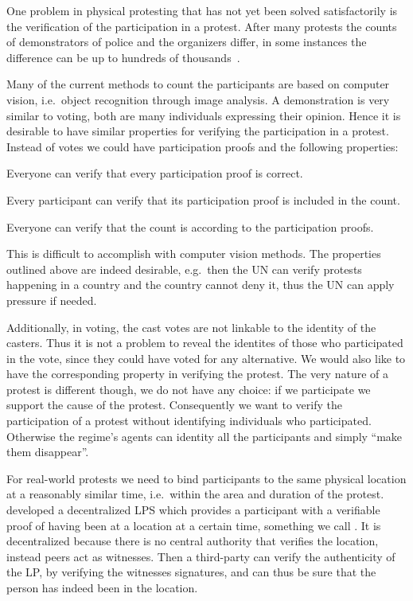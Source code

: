 One problem in physical protesting that has not yet been solved satisfactorily 
is the verification of the participation in a protest.
After many protests the counts of demonstrators of police and the organizers 
differ, in some instances the difference can be up to hundreds of 
thousands~\cite{ExampleProtestCount}.

Many of the current methods to count the participants are based on computer 
vision, i.e.\ object recognition through image analysis.
A demonstration is very similar to voting, both are many individuals expressing 
their opinion.
Hence it is desirable to have similar properties for verifying the 
participation in a protest.
Instead of votes we could have participation proofs and the following 
properties:
\begin{properties}
  \item\label{VerifEligibility} Everyone can verify that every participation 
    proof is correct.
  \item\label{VerifIndividual} Every participant can verify that its 
    participation proof is included in the count.
  \item\label{VerifUniversal} Everyone can verify that the count is according 
    to the participation proofs.
\end{properties}
This is difficult to accomplish with computer vision methods.
The properties outlined above are indeed desirable, e.g.\ then the \ac{UN} can 
verify protests happening in a country and the country cannot deny it, thus the 
\ac{UN} can apply pressure if needed.

Additionally, in voting, the cast votes are not linkable to the identity of the 
casters.
Thus it is not a problem to reveal the identites of those who participated in 
the vote, since they could have voted for any alternative.
We would also like to have the corresponding property in verifying the 
protest.
The very nature of a protest is different though, we do not have any choice: if 
we participate we support the cause of the protest.
Consequently we want to verify the participation of a protest without 
identifying individuals who participated.
Otherwise the regime's agents can identity all the participants and simply 
\enquote{make them disappear}.

For real-world protests we need to bind participants to the same physical 
location at a reasonably similar time, i.e.\ within the area and duration of 
the protest.
\citet{PROPS} developed a decentralized \ac{LPS} which provides a participant 
with a verifiable proof of having been at a location at a certain time, 
something we call .
It is decentralized because there is no central authority that verifies the 
location, instead peers act as witnesses.
Then a third-party can verify the authenticity of the \ac{LP}, by verifying the 
witnesses signatures, and can thus be sure that the person has indeed been in 
the location.

